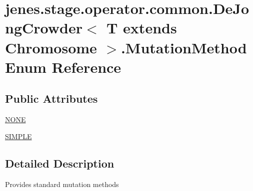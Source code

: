 \hypertarget{enumjenes_1_1stage_1_1operator_1_1common_1_1_de_jong_crowder_3_01_t_01extends_01_chromosome_01_4_1_1_mutation_method}{\section{jenes.\-stage.\-operator.\-common.\-De\-Jong\-Crowder$<$ T extends Chromosome $>$.Mutation\-Method Enum Reference}
\label{enumjenes_1_1stage_1_1operator_1_1common_1_1_de_jong_crowder_3_01_t_01extends_01_chromosome_01_4_1_1_mutation_method}
}
\subsection*{Public Attributes}
\begin{DoxyCompactItemize}
\item 
\hyperlink{enumjenes_1_1stage_1_1operator_1_1common_1_1_de_jong_crowder_3_01_t_01extends_01_chromosome_01_4_1_1_mutation_method_a4246323cddc2e810f35513c3b3c033b3}{N\-O\-N\-E}
\item 
\hyperlink{enumjenes_1_1stage_1_1operator_1_1common_1_1_de_jong_crowder_3_01_t_01extends_01_chromosome_01_4_1_1_mutation_method_a152a3269512eba449ae0fa420bc5d060}{S\-I\-M\-P\-L\-E}
\end{DoxyCompactItemize}


\subsection{Detailed Description}
Provides standard mutation methods 

